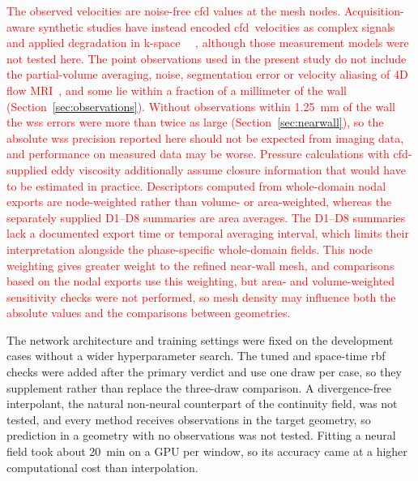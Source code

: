 \documentclass[12pt,a4paper]{article}
\newcommand{\CFD}{\ac{cfd}\xspace}
\newcommand{\WSS}{\ac{wss}\xspace}
\newcommand{\RBF}{\ac{rbf}\xspace}
\theoremstyle{definition}
\numberwithin{equation}{section}
\newcommand{\revision}[1]{\textcolor{red}{#1}}
\begin{document}
\revision{The observed velocities are noise-free \CFD values at the mesh nodes. Acquisition-aware synthetic studies have instead encoded \CFD{}\ velocities as complex signals and applied degradation in k-space~\mbox{ \cite{ferdian2020fourflownet,saitta2024implicit}}\hskip0pt , although those measurement models were not tested here. The point observations used in the present study do not include the partial-volume averaging, noise, segmentation error or velocity aliasing of 4D flow MRI~\cite{markl2012fourd}, and some lie within a fraction of a millimeter of the wall (Section~\ref{sec:observations}). Without observations within 1.25~mm of the wall the \WSS errors were more than twice as large (Section~\ref{sec:nearwall}), so the absolute \WSS precision reported here should not be expected from imaging data, and performance on measured data may be worse. Pressure calculations with \CFD-supplied eddy viscosity additionally assume closure information that would have to be estimated in practice. Descriptors computed from whole-domain nodal exports are node-weighted rather than volume- or area-weighted, whereas the separately supplied D1--D8 summaries are area averages. The D1--D8 summaries lack a documented export time or temporal averaging interval, which limits their interpretation alongside the phase-specific whole-domain fields. This node weighting gives greater weight to the refined near-wall mesh, and comparisons based on the nodal exports use this weighting, but area- and volume-weighted sensitivity checks were not performed, so mesh density may influence both the absolute values and the comparisons between geometries.}

The network architecture and training settings were fixed on the development cases without a wider hyperparameter search. The tuned and space-time \RBF checks were added after the primary verdict and use one draw per case, so they supplement rather than replace the three-draw comparison. A divergence-free interpolant, the natural non-neural counterpart of the continuity field, was not tested, and every method receives observations in the target geometry, so prediction in a geometry with no observations was not tested. Fitting a neural field took about 20~min on a GPU per window, so its accuracy came at a higher computational cost than interpolation.
\end{document}
